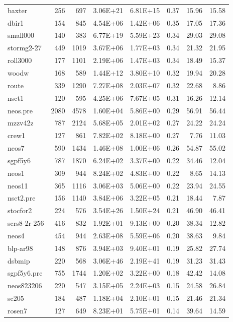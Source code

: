 \documentclass[10pt]{article}
\begin{document}
\begin{longtable}{|l|r|r|r|r|r|r|r|}
baxter	&	256	&	697	&	3.06E+21	&	6.81E+15	&	0.37	&	15.96	&	15.58	\\
dbir1	&	154	&	845	&	4.54E+06	&	1.42E+06	&	0.35	&	17.05	&	17.36	\\
small000	&	140	&	383	&	6.77E+19	&	5.59E+23	&	0.34	&	29.03	&	29.08	\\
stormg2-27	&	449	&	1019	&	3.67E+06	&	1.77E+03	&	0.34	&	21.32	&	21.95	\\
roll3000	&	177	&	1101	&	2.19E+06	&	1.47E+03	&	0.34	&	18.49	&	15.37	\\
woodw	&	168	&	589	&	1.44E+12	&	3.80E+10	&	0.32	&	19.94	&	20.28	\\
route	&	339	&	1290	&	7.27E+08	&	2.03E+07	&	0.32	&	22.68	&	8.86	\\
nsct1	&	120	&	595	&	4.25E+06	&	7.67E+05	&	0.31	&	16.26	&	12.14	\\
neos.pre	&	2080	&	4578	&	1.60E+04	&	5.86E+00	&	0.29	&	56.91	&	56.44	\\
mzzv42z	&	787	&	2124	&	5.68E+05	&	2.01E+02	&	0.27	&	24.22	&	24.24	\\
crew1	&	127	&	861	&	7.82E+02	&	8.18E+00	&	0.27	&	7.76	&	11.03	\\
neos7	&	590	&	1434	&	1.46E+08	&	1.00E+06	&	0.26	&	54.87	&	55.02	\\
sgpf5y6	&	787	&	1870	&	6.24E+02	&	3.37E+00	&	0.22	&	34.46	&	12.04	\\
neos1	&	309	&	944	&	8.24E+02	&	4.83E+00	&	0.22	&	8.65	&	14.13	\\
neos11	&	365	&	1116	&	3.06E+03	&	5.06E+00	&	0.22	&	23.94	&	24.55	\\
nsct2.pre	&	156	&	1140	&	3.84E+06	&	3.22E+05	&	0.21	&	18.44	&	7.87	\\
stocfor2	&	224	&	576	&	3.54E+26	&	1.50E+24	&	0.21	&	46.90	&	46.41	\\
scrs8-2r-256	&	416	&	832	&	1.92E+01	&	9.13E+00	&	0.20	&	38.34	&	12.82	\\
neos4	&	454	&	944	&	2.63E+08	&	5.59E+06	&	0.20	&	38.63	&	9.84	\\
blp-ar98	&	148	&	876	&	3.94E+03	&	9.40E+01	&	0.19	&	25.82	&	27.74	\\
dsbmip	&	220	&	568	&	3.06E+46	&	2.19E+41	&	0.19	&	31.23	&	31.43	\\
sgpf5y6.pre	&	755	&	1744	&	1.20E+02	&	3.22E+00	&	0.18	&	42.42	&	14.08	\\
neos823206	&	220	&	547	&	3.15E+05	&	2.24E+03	&	0.15	&	24.58	&	26.84	\\
sc205	&	184	&	487	&	1.18E+04	&	2.10E+01	&	0.15	&	21.46	&	21.34	\\
rosen7	&	127	&	649	&	8.23E+01	&	5.75E+01	&	0.14	&	39.64	&	14.59	\\

\end{longtable}
\end{document}
